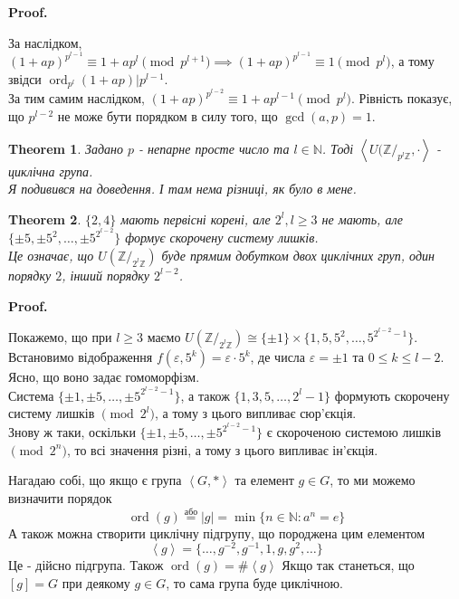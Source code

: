 \documentclass[a4paper, 10pt]{article}
\makeatletter
\theoremstyle{theoremdd}
\newtheorem{theorem}{Theorem}[subsection]
\theoremstyle{theoremdd}
\theoremstyle{theoremdd}
\theoremstyle{theoremdd}
\theoremstyle{theoremdd}
\theoremstyle{theoremdd}
\theoremstyle{theoremdd}
\theoremstyle{theoremdd}
\renewenvironment{proof}[1][Proof.\\]{\par
\pushQED{\hfill \qed}%
\normalfont \topsep6\p@\@plus6\p@\relax
\trivlist
\item\relax
{\bfseries
#1\@addpunct{.}}\hspace\labelsep\ignorespaces
}{%
\popQED\endtrivlist\@endpefalse
}
\DeclareMathOperator{\ord}{ord}
\makeatother
\begin{document}
\begin{proof}
За наслідком, $(1+ap)^{p^{l-1}} \equiv 1 + ap^l \pmod {p^{l+1}} \implies (1+ap)^{p^{l-1}} \equiv 1 \pmod {p^l}$, а тому звідси $\ord_{p^l} (1+ap) | p^{l-1}$.\\
За тим самим наслідком, $(1+ap)^{p^{l-2}} \equiv 1+ap^{l-1} \pmod{p^l}$. Рівність показує, що $p^{l-2}$ не може бути порядком в силу того, що $\gcd(a,p) = 1$.
\end{proof}

\begin{theorem}
Задано $p$ - непарне просте число та $l \in \mathbb{N}$. Тоді $\left< U(\mathbb{Z}/_{p^l \mathbb{Z}}, \cdot \right>$ - циклічна група.\\
\textit{Я подивився на доведення. І там нема різниці, як було в мене.}
\end{theorem}
\fi

\begin{theorem}
$\{2,4\}$ мають первісні корені, але $2^l, l \geq 3$ не мають, але $\{\pm 5, \pm 5^2, \dots , \pm 5^{2^{l-2}}\}$ формує скорочену систему лишків.\\
Це означає, що $U(\mathbb{Z}/_{2^l \mathbb{Z}})$ буде прямим добутком двох циклічних груп, один порядку $2$, інший порядку $2^{l-2}$.
\end{theorem}

\begin{proof}
Покажемо, що при $l \geq 3$ маємо $U(\mathbb{Z}/_{2^l \mathbb{Z}}) \cong \{\pm 1\} \times \{ 1, 5, 5^2, \dots, 5^{2^{l-2}-1} \}$.\\
Встановимо відображення $f(\varepsilon, 5^k) = \varepsilon \cdot 5^k$, де числа $\varepsilon = \pm 1$ та $0 \leq k \leq l-2$. Ясно, що воно задає гомоморфізм.\\
Система $\{\pm 1, \pm 5, \dots, \pm 5^{2^{l-2}-1}\}$, а також $\{1,3,5,\dots,2^{l}-1\}$ формують скорочену систему лишків $\pmod {2^l}$, а тому з цього випливає сюр'єкція.\\
Знову ж таки, оскільки $\{\pm 1, \pm 5, \dots, \pm 5^{2^{l-2}-1}\}$ є скороченою системою лишків $\pmod {2^n}$, то всі значення різні, а тому з цього випливає ін'єкція.
\end{proof}

\iffalse
Нагадаю собі, що якщо є група $\left<G, * \right>$ та елемент $g \in G$, то ми можемо визначити порядок
$$ \ord (g) \overset{\text{або}}{=} |g| = \min \{n \in \mathbb{N}: a^n = e \}$$
А також можна створити циклічну підгрупу, що породжена цим елементом
$$ \left<g\right> = \{\dots,g^{-2},g^{-1},1,g,g^2,\dots\} $$
Це - дійсно підгрупа. Також $\ord(g) = \#\left<g\right>$ Якщо так станеться, що $[g] = G$ при деякому $g \in G$, то сама група буде циклічною.
\end{document}
